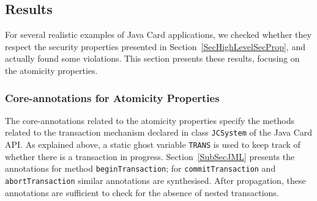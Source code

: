 \subsection{Results}\label{SecResults}

For several realistic examples of Java Card applications, we checked
whether they respect the security properties presented in
Section~\ref{SecHighLevelSecProp}, and actually found some violations.
This section presents these results, focusing on the atomicity
properties.

\subsubsection{Core-annotations for Atomicity Properties}

The core-annotations related to the atomicity properties specify the
methods related to the transaction mechanism declared in class
\texttt{JCSystem} of the Java Card API. As explained above, a static
ghost variable \texttt{TRANS} is used to keep track of whether there
is a transaction in progress.  Section~\ref{SubSecJML} presents the
annotations for method
\texttt{beginTransaction}; for \texttt{commitTransaction} and 
\texttt{abortTransaction} similar annotations are synthesised. 
After propagation, these annotations are sufficient to check for the
absence of nested transactions.



